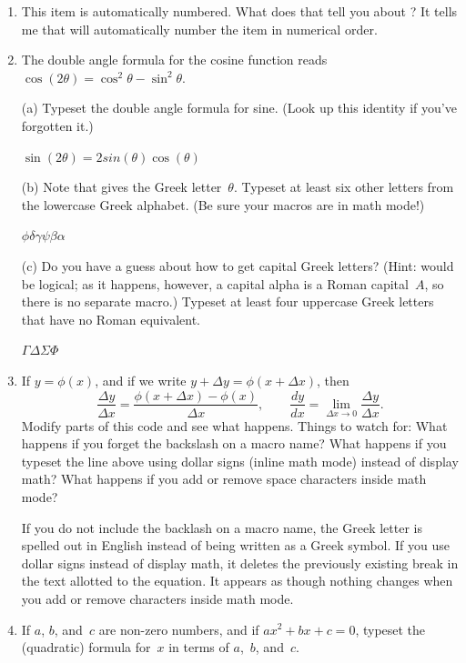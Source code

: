 \begin{enumerate}

\item This item is automatically numbered. What does that tell you
  about ?
\soln It tells me that  will automatically number the item in numerical order. 

\item The double angle formula for the cosine function reads
  $\cos(2\theta) = \cos^{2}\theta - \sin^{2}\theta$.

  (a) Typeset the double angle formula for sine. (Look up this
  identity if you've forgotten it.)

  \soln $\sin(2\theta) = 2sin(\theta)\cos(\theta)$

  (b) Note that  gives the Greek letter~$\theta$. Typeset
  at least six other letters from the lowercase Greek alphabet. (Be
  sure your macros are in math mode!)

  \soln $\phi\delta\gamma\psi\beta\alpha$

  (c) Do you have a guess about how to get capital Greek letters?
  (Hint:  would be logical; as it happens, however, a
  capital alpha is a Roman capital~$A$, so there is no separate
  macro.) Typeset at least four uppercase Greek letters that have no
  Roman equivalent.

  \soln $\Gamma\Delta\Sigma\Phi$

\item If $y = \phi(x)$, and if we write $y + \Delta y = \phi(x + \Delta x)$,
  then
  \[ 
  \frac{\Delta y}{\Delta x} = \frac{\phi(x + \Delta x) - \phi(x)}{\Delta x},
  \qquad
  \frac{dy}{dx} = \lim_{\Delta x \to 0} \frac{\Delta y}{\Delta x}.
  \] 
  Modify parts of this code and see what happens. Things to watch for:
  What happens if you forget the backslash on a macro name? What
  happens if you typeset the line above using dollar signs (inline
  math mode) instead of display math? What happens if you add or
  remove space characters inside math mode?

\soln If you do not include the backlash on a macro name, the Greek letter is spelled out in English instead of being written as a Greek symbol. If you use dollar signs instead of display math, it deletes the previously existing break in the text allotted to the equation. It appears as though nothing changes when you add or remove characters inside math mode.  
\item If $a$, $b$, and~$c$ are non-zero numbers, and if
  $ax^{2} + bx + c = 0$, typeset the (quadratic) formula for~$x$ in
  terms of $a$,~$b$, and~$c$.


\end{enumerate}
